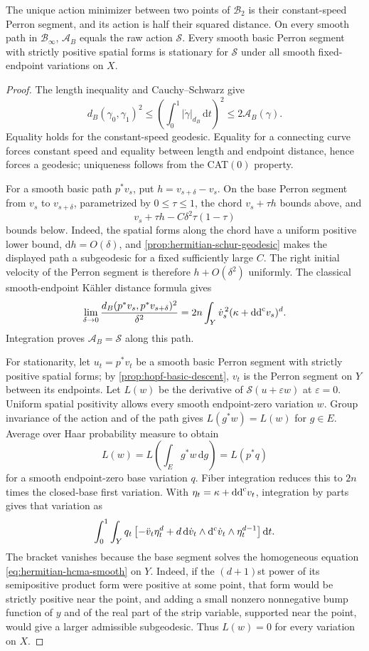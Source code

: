 \begin{proposition}\label{prop:hopf-basic-action}
The unique action minimizer between two points of $\mathcal B_2$ is their constant-speed Perron segment, and its action is half their squared distance. On every smooth path in $\mathcal B_\infty$, $\mathcal A_B$ equals the raw action $\mathscr S$. Every smooth basic Perron segment with strictly positive spatial forms is stationary for $\mathscr S$ under all smooth fixed-endpoint variations on $X$.
\end{proposition}
\begin{proof}
The length inequality and Cauchy--Schwarz give
\[
 d_B(\gamma_0,\gamma_1)^2
 \leq\left(\int_0^1|\dot\gamma|_{d_B}\,\mathrm dt\right)^2
 \leq2\mathcal A_B(\gamma).
\]
Equality holds for the constant-speed geodesic. Equality for a connecting curve forces constant speed and equality between length and endpoint distance, hence forces a geodesic; uniqueness follows from the CAT$(0)$ property.

For a smooth basic path $p^*v_s$, put $h=v_{s+\delta}-v_s$. On the base Perron segment from $v_s$ to $v_{s+\delta}$, parametrized by $0\leq\tau\leq1$, the chord $v_s+\tau h$ bounds above, and
\[
 v_s+\tau h-C\delta^2\tau(1-\tau)
\]
bounds below. Indeed, the spatial forms along the chord have a uniform positive lower bound, $\mathrm dh=O(\delta)$, and \cref{prop:hermitian-schur-geodesic} makes the displayed path a subgeodesic for a fixed sufficiently large $C$. The right initial velocity of the Perron segment is therefore $h+O(\delta^2)$ uniformly. The classical smooth-endpoint K\"ahler distance formula gives
\[
 \lim_{\delta\to0}\frac{d_B(p^*v_s,p^*v_{s+\delta})^2}{\delta^2}
 =2n\int_Y\dot v_s^{\,2}(\kappa+\mathrm{dd}^{\mathrm{c}} v_s)^d.
\]
Integration proves $\mathcal A_B=\mathscr S$ along this path.

For stationarity, let $u_t=p^*v_t$ be a smooth basic Perron segment with strictly positive spatial forms; by \cref{prop:hopf-basic-descent}, $v_t$ is the Perron segment on $Y$ between its endpoints. Let $L(w)$ be the derivative of $\mathscr S(u+\varepsilon w)$ at $\varepsilon=0$. Uniform spatial positivity allows every smooth endpoint-zero variation $w$. Group invariance of the action and of the path gives $L(g^*w)=L(w)$ for $g\in E$. Average over Haar probability measure to obtain
\[
 L(w)=L\left(\int_Eg^*w\,\mathrm dg\right)=L(p^*q)
\]
for a smooth endpoint-zero base variation $q$. Fiber integration reduces this to $2n$ times the closed-base first variation. With $\eta_t=\kappa+\mathrm{dd}^{\mathrm{c}} v_t$, integration by parts gives that variation as
\[
 \int_0^1\int_Yq_t\left[-\ddot v_t\eta_t^d
 +d\,\mathrm d\dot v_t\wedge\mathrm d^{\mathrm c}\dot v_t\wedge\eta_t^{d-1}\right]\mathrm dt.
\]
The bracket vanishes because the base segment solves the homogeneous equation \eqref{eq:hermitian-hcma-smooth} on $Y$. Indeed, if the $(d+1)$st power of its semipositive product form were positive at some point, that form would be strictly positive near the point, and adding a small nonzero nonnegative bump function of $y$ and of the real part of the strip variable, supported near the point, would give a larger admissible subgeodesic. Thus $L(w)=0$ for every variation on $X$.
\end{proof}

